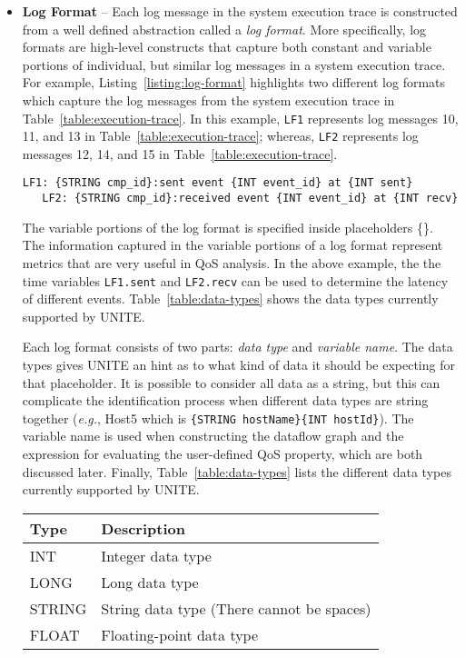 \begin{itemize}
  \item \textbf{Log Format} -- Each log message in the system execution 
  trace is constructed from a well defined abstraction called a \textit{log 
  format}. More specifically, log formats are high-level constructs that 
  capture both constant and variable portions of individual, but similar 
  log messages in a system execution trace. For example,
  Listing~\ref{listing:log-format}  
  highlights two different log formats which capture the log messages from
  the system execution trace in Table~\ref{table:execution-trace}.
  In this example, \texttt{LF1} represents log messages 10, 11, and 13
  in Table~\ref{table:execution-trace}; whereas, \texttt{LF2} represents
  log messages 12, 14, and 15 in Table~\ref{table:execution-trace}.
  \begin{lstlisting}[label=listing:log-format, 
   caption=Example log formats that represent different log messages in a system execution trace.,
   captionpos=b]
   LF1: {STRING cmp_id}:sent event {INT event_id} at {INT sent}
   LF2: {STRING cmp_id}:received event {INT event_id} at {INT recv}
  \end{lstlisting}
  
  The variable portions of the log format is specified inside placeholders \{\}.
  The information captured in the variable portions of a log format represent 
  metrics that  are very useful in QoS analysis. In the above example, the 
  the time variables \texttt{LF1.sent} and \texttt{LF2.recv} can be used to 
  determine the latency of different events. Table~\ref{table:data-types} 
  shows the data types currently supported by UNITE.
  
  Each log format consists of two parts: \textit{data type} and 
  \textit{variable name}. 
  The data types gives UNITE an hint as to what kind of data it
  should be expecting for that placeholder. It is possible to consider
  all data as a string, but this can complicate the identification 
  process when different data types are string together (\textit{e.g.},
  Host5 which is \texttt{\{STRING hostName\}\{INT hostId\}}). The 
  variable name is used when constructing the dataflow graph and the
  expression for evaluating the user-defined QoS property, which are
  both discussed later. Finally, Table~\ref{table:data-types} lists 
  the different data types currently supported by UNITE. 
 \begin{table}[h, captionpos=b]
  \centering
  \begin{tabular}{ll}
  \hline
  \textbf{Type} & \textbf{Description} \\
  \hline
  INT & Integer data type \\
  LONG & Long data type \\
  STRING & String data type (There cannot be spaces) \\
  FLOAT & Floating-point data type \\
  \hline
  \end{tabular}
  

\end{table}
\end{itemize}
